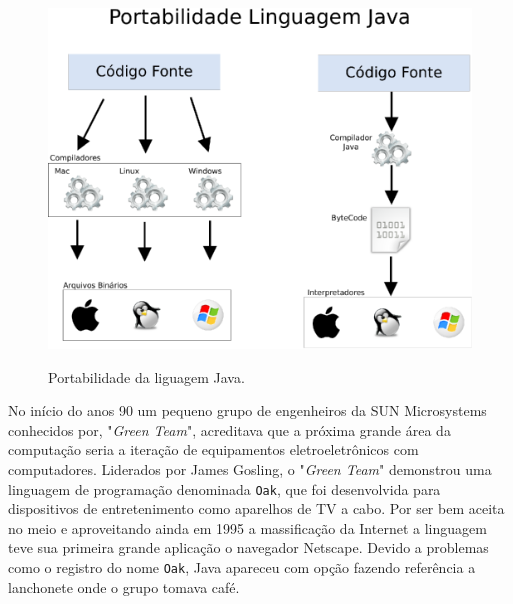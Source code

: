 \begin{figure}[h]
	\center
	\includegraphics[scale=0.8]{Imagens/portabilidadeJava}
	\label{fig:portabilidadeJava}
	\caption{Portabilidade da liguagem Java.}
\end{figure}


No in\'{i}cio do anos 90 um pequeno grupo de engenheiros da SUN Microsystems conhecidos por, "\textit{Green Team}", acreditava que a pr\'{o}xima grande \'{a}rea da computa\c{c}\~{a}o seria a itera\c{c}\~{a}o de equipamentos eletroeletr\^{o}nicos com computadores. Liderados por James Gosling, o "\textit{Green Team}" demonstrou uma linguagem de programa\c{c}\~{a}o denominada \texttt{Oak}, que foi desenvolvida para dispositivos de entretenimento como aparelhos de TV a cabo. Por ser bem aceita no meio e aproveitando ainda em 1995 a massifica\c{c}\~{a}o da Internet a linguagem teve sua primeira grande aplica\c{c}\~{a}o o navegador Netscape. Devido a problemas como o registro do nome \texttt{Oak}, Java apareceu com op\c{c}\~{a}o fazendo refer\^{e}ncia a lanchonete onde o grupo tomava caf\'{e}.





